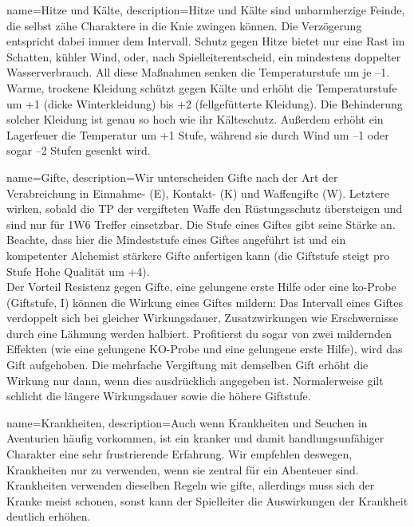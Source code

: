 {
    name={Hitze und Kälte},
    description={Hitze und Kälte sind unbarmherzige Feinde, die selbst zähe Charaktere in die Knie zwingen können. Die Verzögerung entspricht dabei immer dem Intervall. Schutz gegen Hitze bietet nur eine Rast im Schatten, kühler Wind, oder, nach Spielleiterentscheid, ein mindestens doppelter Wasserverbrauch. All diese Maßnahmen senken die Temperaturstufe um je –1. Warme, trockene Kleidung schützt gegen Kälte und erhöht die Temperaturstufe um +1 (dicke Winterkleidung) bis +2 (fellgefütterte Kleidung). Die Behinderung solcher Kleidung ist genau so hoch wie ihr Kälteschutz. Außerdem erhöht ein Lagerfeuer die Temperatur um +1 Stufe, während sie durch Wind um –1 oder sogar –2 Stufen gesenkt wird.}}

{
    name={Gifte},
    description={Wir unterscheiden Gifte nach der Art der Verabreichung in Einnahme- (E), Kontakt- (K) und Waffengifte (W). Letztere wirken, sobald die TP der vergifteten Waffe den Rüstungsschutz übersteigen und sind nur für 1W6 Treffer einsetzbar. Die Stufe eines Giftes gibt seine Stärke an. Beachte, dass hier die Mindeststufe eines Giftes angeführt ist und ein kompetenter Alchemist stärkere Gifte anfertigen kann (die Giftstufe steigt pro Stufe Hohe Qualität um +4).\\
Der Vorteil Resistenz gegen Gifte, eine gelungene erste Hilfe oder eine \gls{ko}-Probe (Giftstufe, I) können die Wirkung eines Giftes mildern: Das Intervall eines Giftes verdoppelt sich bei gleicher Wirkungsdauer, Zusatzwirkungen wie Erschwernisse durch eine Lähmung werden halbiert. Profitierst du sogar von zwei mildernden Effekten (wie eine gelungene KO-Probe und eine gelungene erste Hilfe), wird das Gift aufgehoben. Die mehrfache Vergiftung mit demselben Gift erhöht die Wirkung nur dann, wenn dies ausdrücklich angegeben ist. Normalerweise gilt schlicht die längere Wirkungsdauer sowie die höhere Giftstufe.}}

{
    name={Krankheiten},
    description={Auch wenn Krankheiten und Seuchen in Aventurien häufig vorkommen, ist ein kranker und damit handlungsunfähiger Charakter eine sehr frustrierende Erfahrung. Wir empfehlen deswegen, Krankheiten nur zu verwenden, wenn sie zentral für ein Abenteuer sind. Krankheiten verwenden dieselben Regeln wie \gls{gifte}, allerdings muss sich der Kranke meist schonen, sonst kann der Spielleiter die Auswirkungen der Krankheit deutlich erhöhen.}}
    
        
        
        
        